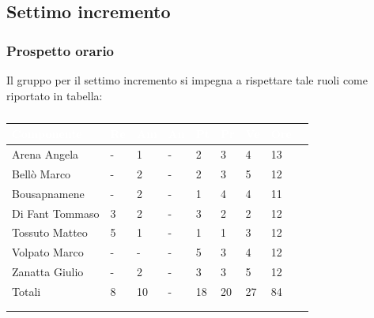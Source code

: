     \subsection{Settimo incremento} 
    {
    \subsubsection{Prospetto orario}
    {
    Il gruppo per il settimo incremento si impegna a rispettare tale ruoli come riportato in tabella:
      \setlength{\freewidth}{\dimexpr\textwidth-30\tabcolsep}
      \renewcommand{\arraystretch}{1.0}
      \setlength{\aboverulesep}{0pt}
      \setlength{\belowrulesep}{0pt}
      \begin{longtable}{C{.4\freewidth} C{.1\freewidth} C{.1\freewidth} C{.1\freewidth} C{.1\freewidth} C{.1\freewidth} C{.1\freewidth} C{.1\freewidth} C{.1\freewidth}}
      \toprule
      \textcolor{white}{\textbf{Componente}}&
      \textcolor{white}{\textbf{Re}}&
      \textcolor{white}{\textbf{Am}}&
      \textcolor{white}{\textbf{An}}&
      \textcolor{white}{\textbf{Pt}}&
      \textcolor{white}{\textbf{Pr}}&
      \textcolor{white}{\textbf{Ve}}&
      \textcolor{white}{\textbf{Ore}}\\
      \toprule
      \endhead

      Arena Angela & - & 1 & -  & 2 & 3 & 4 & 13 \\      
      Bellò Marco & - & 2 & - & 2 & 3 & 5 & 12 \\      
      Bousapnamene & - & 2 & - & 1 & 4 & 4 & 11 \\      
      Di Fant Tommaso & 3 & 2 & - & 3 & 2 & 2 & 12 \\      
      Tossuto Matteo & 5 & 1 & - & 1 & 1 & 3 & 12 \\      
      Volpato Marco & - & - & - & 5 & 3 & 4 & 12 \\      
      Zanatta Giulio & - & 2 & - & 3 & 3 & 5 & 12 \\      
      Totali & 8 & 10 & - & 18 & 20 & 27 & 84 \\
      \bottomrule 
      \\
      \caption{}

      \end{longtable} 

}}
